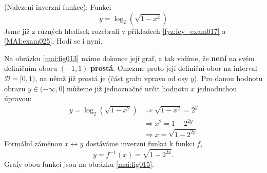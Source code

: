 \begin{mdframed}[style=mdexam]
  \begin{example}\label{MAI:exam027}
    (Nalezení inverzní funkce): Funkci 
    \begin{equation*}
      y = \log_2(\sqrt{1-x^2})
    \end{equation*}
    Jsme již z různých hledisek rozebrali v příkladech \ref{fyz:fey_exam017} a \ref{MAI:exam025}. 
    Hodí se i nyní.

    {\centering
    \captionsetup{type=figure}
    \par}
    
    Na obrázku \ref{mai:fig013} máme dokonce její graf, a tak vidíme, že \textbf{není} na svém 
    definičním oboru \((-1, 1)\) \textbf{prostá}. Omezme proto její definiční obor na interval 
    \(\mathcal{D} = [0, 1)\), na němž již prostá je (část grafu vpravo od osy \(y\)). Pro danou 
    hodnotu obrazu \(y \in (-\infty,0]\) můžeme již jednoznačně určit hodnotu \(x\) jednoduchou 
    úpravou:
    \begin{align*}
      y = \log_2(\sqrt{1-x^2}) &\Rightarrow \sqrt{1-x^2} = 2^y   \\
                               &\Rightarrow x^2 = 1 - 2^{2y}     \\
                               &\Rightarrow x = \sqrt{1 - 2^{2y}}
    \end{align*}
    Formální záměnou \(x \leftrightarrow y\) dostáváme inverzní funkci k funkci \(f\),
    \begin{equation*}
      y =f^{-1}(x) = \sqrt{1 - 2^{2x}}.
    \end{equation*}
    Grafy obou funkcí jsou na obrázku \ref{mai:fig015}.
  \end{example}
\end{mdframed}